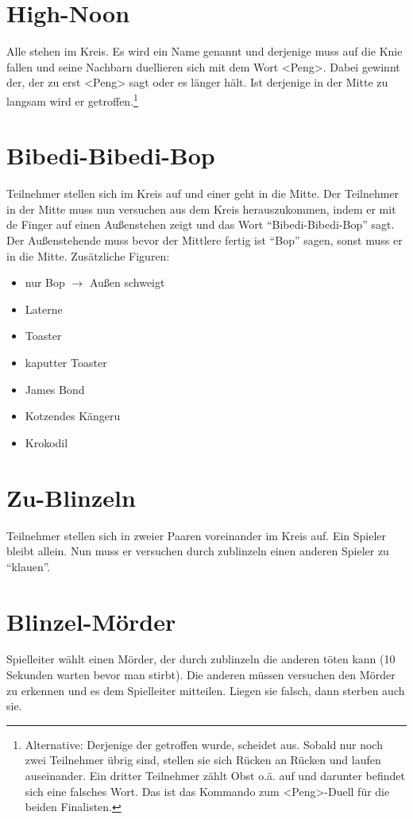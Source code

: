 \documentclass[ngerman, a4paper, twoside]{scrbook}%
\begin{document}
	\section{High-Noon}
	Alle stehen im Kreis. Es wird ein Name genannt und derjenige muss auf die Knie fallen und seine Nachbarn duellieren sich mit dem Wort <Peng>. Dabei gewinnt der, der zu erst <Peng> sagt oder es länger hält. Ist derjenige in der Mitte zu langsam wird er getroffen.\footnote{Alternative: Derjenige der getroffen wurde, scheidet aus. Sobald nur noch zwei Teilnehmer übrig sind, stellen sie sich Rücken an Rücken und laufen auseinander. Ein dritter Teilnehmer zählt Obst o.ä. auf und darunter befindet sich eine falsches Wort. Das ist das Kommando zum <Peng>-Duell für die beiden Finalisten.}
	\section{Bibedi-Bibedi-Bop}
	Teilnehmer stellen sich im Kreis auf und einer geht in die Mitte. Der Teilnehmer in der Mitte muss nun versuchen aus dem Kreis herauszukommen, indem er mit de Finger auf einen Außenstehen zeigt und das Wort "`Bibedi-Bibedi-Bop"' sagt. Der Außenstehende muss bevor der Mittlere fertig ist "`Bop"' sagen, sonst muss er in die Mitte. Zusätzliche Figuren:
	\begin{itemize}
		\item nur Bop $\rightarrow$ Außen schweigt
		\item Laterne
		\item Toaster
		\item kaputter Toaster
		\item James Bond
		\item Kotzendes Kängeru
		\item Krokodil
	\end{itemize}
	\section{Zu-Blinzeln}
	Teilnehmer stellen sich in zweier Paaren voreinander im Kreis auf. Ein Spieler bleibt allein. Nun muss er versuchen durch zublinzeln einen anderen Spieler zu "`klauen"'.
	\section{Blinzel-Mörder}
	Spielleiter wählt einen Mörder, der durch zublinzeln die anderen töten kann (10 Sekunden warten bevor man stirbt). Die anderen müssen versuchen den Mörder zu erkennen und es dem Spielleiter mitteilen. Liegen sie falsch, dann sterben auch sie.
\end{document}
